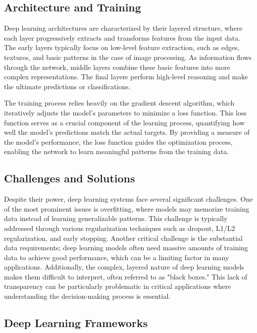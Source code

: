 \subsection{Architecture and Training}\label{sec:architecture_and_training}

Deep learning architectures are characterized by their layered
structure, where each layer progressively extracts and transforms
features from the input data. The early layers typically focus on
low-level feature extraction, such as edges, textures, and basic
patterns in the case of image processing. As information flows through
the network, middle layers combine these basic features into more
complex representations. The final layers perform high-level reasoning
and make the ultimate predictions or classifications.

The training process relies heavily on the gradient descent
algorithm, which iteratively adjusts the model's parameters to
minimize a loss function. This loss function serves as a crucial
component of the learning process, quantifying how well the model's
predictions match the actual targets. By providing a measure of the
model's performance, the loss function guides the optimization process,
enabling the network to learn meaningful patterns from the training
data.

\subsection{Challenges and Solutions}

Despite their power, deep learning systems face several significant
challenges. One of the most prominent issues is overfitting, where
models may memorize training data instead of learning generalizable
patterns. This challenge is typically addressed through various
regularization techniques such as dropout, L1/L2 regularization, and
early stopping. Another critical challenge is the substantial data
requirements; deep learning models often need massive amounts of
training data to achieve good performance, which can be a limiting
factor in many applications. Additionally, the complex, layered nature
of deep learning models makes them difficult to interpret, often
referred to as "black boxes." This lack of transparency can be
particularly problematic in critical applications where understanding
the decision-making process is essential.

\subsection{Deep Learning Frameworks}

